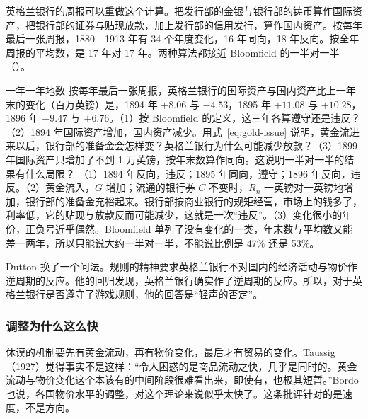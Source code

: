 英格兰银行的周报可以重做这个计算。把发行部的金银与银行部的铸币算作国际资产，把银行部的证券与贴现放款，加上发行部的信用发行，算作国内资产。按每年最后一张周报，1880—1913 年有 34 个年度变化，16 年同向，18 年反向\cite{boe2017}。按全年周报的平均数，是 17 年对 17 年\cite{boe2017}。两种算法都接近 Bloomfield 的一半对一半（）。


\begin{example}{一年一年地数}\label{ex:gold-rules}
按每年最后一张周报，英格兰银行的国际资产与国内资产比上一年末的变化（百万英镑）是，1894 年 $+8.06$ 与 $-4.53$，1895 年 $+11.08$ 与 $+10.28$，1896 年 $-9.47$ 与 $+6.76$。（1）按 Bloomfield 的定义，这三年各算遵守还是违反？（2）1894 年国际资产增加，国内资产减少。用式~\eqref{eq:gold-issue} 说明，黄金流进来以后，银行部的准备金会怎样变？英格兰银行为什么可能减少放款？（3）1899 年国际资产只增加了不到 1 万英镑，按年末数算作同向。这说明一半对一半的结果有什么局限？
\solution （1）1894 年反向，违反；1895 年同向，遵守；1896 年反向，违反。（2）黄金流入，$G$ 增加；流通的银行券 $C$ 不变时，$R_n$ 一英镑对一英镑地增加，银行部的准备金充裕起来。银行部按商业银行的规矩经营，市场上的钱多了，利率低，它的贴现与放款反而可能减少，这就是一次“违反”。（3）变化很小的年份，正负号近乎偶然。Bloomfield 单列了没有变化的一类，年末数与平均数又能差一两年，所以只能说大约一半对一半，不能说比例是 47\% 还是 53\%。
\end{example}

Dutton 换了一个问法。规则的精神要求英格兰银行不对国内的经济活动与物价作逆周期的反应。他的回归发现，英格兰银行确实作了逆周期的反应\cite{dutton1984}。所以，对于英格兰银行是否遵守了游戏规则，他的回答是“轻声的否定”\cite{dutton1984}。

\subsubsection{调整为什么这么快}
休谟的机制要先有黄金流动，再有物价变化，最后才有贸易的变化。Taussig（1927）觉得事实不是这样：“令人困惑的是商品流动之快，几乎是同时的。黄金流动与物价变化这个本该有的中间阶段很难看出来，即使有，也极其短暂。”\cite{bordo1984}Bordo 也说，各国物价水平的调整，对这个理论来说似乎太快了\cite{bordo1984}。这条批评针对的是速度，不是方向。

